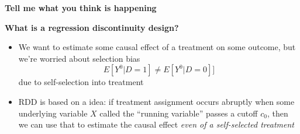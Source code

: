 \documentclass[notes=show]{beamer}
\begin{document}
	
\begin{frame}[plain]
	\begin{center}
	\textbf{Tell me what you think is happening}
	\end{center}
	
	\begin{figure}
	\end{figure}
\end{frame}




\begin{frame}[plain]
	\begin{center}
	\textbf{What is a regression discontinuity design?}
	\end{center}

	\begin{itemize}	
	\item We want to estimate some causal effect of a treatment on some outcome, but we're worried about selection bias $$E[Y^0|D=1] \neq E[Y^0 | D=0]]$$due to self-selection into treatment
	\item RDD is based on a idea:  if treatment assignment occurs abruptly when some underlying variable $X$ called the ``running variable'' passes a cutoff $c_0$, then we can use that to estimate the causal effect \emph{even of a self-selected treatment}
	\end{itemize}
\end{frame}
\end{document}
